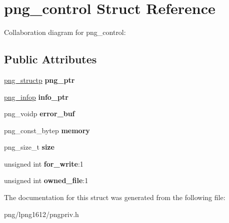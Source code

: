 \hypertarget{structpng__control}{\section{png\+\_\+control Struct Reference}
\label{structpng__control}
}


Collaboration diagram for png\+\_\+control\+:
\subsection*{Public Attributes}
\begin{DoxyCompactItemize}
\item 
\hypertarget{structpng__control_a43333534632030e056daf3afa48db51e}{\hyperlink{structpng__struct__def}{png\+\_\+structp} {\bfseries png\+\_\+ptr}}\label{structpng__control_a43333534632030e056daf3afa48db51e}

\item 
\hypertarget{structpng__control_a224678ad762ab6a868c085f78ae932d4}{\hyperlink{structpng__info__def}{png\+\_\+infop} {\bfseries info\+\_\+ptr}}\label{structpng__control_a224678ad762ab6a868c085f78ae932d4}

\item 
\hypertarget{structpng__control_a905bcfc3a2d1497bdfbbc0727cefd716}{png\+\_\+voidp {\bfseries error\+\_\+buf}}\label{structpng__control_a905bcfc3a2d1497bdfbbc0727cefd716}

\item 
\hypertarget{structpng__control_a96fa2f945a1d3163b6c1f79bf66f2ddd}{png\+\_\+const\+\_\+bytep {\bfseries memory}}\label{structpng__control_a96fa2f945a1d3163b6c1f79bf66f2ddd}

\item 
\hypertarget{structpng__control_acd4e0d9812d5efe466d5401268149ad9}{png\+\_\+size\+\_\+t {\bfseries size}}\label{structpng__control_acd4e0d9812d5efe466d5401268149ad9}

\item 
\hypertarget{structpng__control_aa8b880c377588bebcf2fd9af99d58e4f}{unsigned int {\bfseries for\+\_\+write}\+:1}\label{structpng__control_aa8b880c377588bebcf2fd9af99d58e4f}

\item 
\hypertarget{structpng__control_a6d275eb8c40d78757eec1cf96b128961}{unsigned int {\bfseries owned\+\_\+file}\+:1}\label{structpng__control_a6d275eb8c40d78757eec1cf96b128961}

\end{DoxyCompactItemize}


The documentation for this struct was generated from the following file\+:\begin{DoxyCompactItemize}
\item 
png/lpng1612/pngpriv.\+h\end{DoxyCompactItemize}
